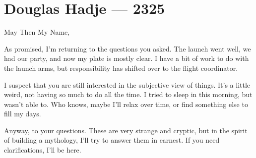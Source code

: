 \hypertarget{douglas-hadje-2325}{%
\chapter{Douglas Hadje — 2325}\label{douglas-hadje-2325}}

May Then My Name,

As promised, I'm returning to the questions you asked. The launch went well, we had our party, and now my plate is mostly clear. I have a bit of work to do with the launch arms, but responsibility has shifted over to the flight coordinator.

I suspect that you are still interested in the subjective view of things. It's a little weird, not having so much to do all the time. I tried to sleep in this morning, but wasn't able to. Who knows, maybe I'll relax over time, or find something else to fill my days.

Anyway, to your questions. These are very strange and cryptic, but in the spirit of building a mythology, I'll try to answer them in earnest. If you need clarifications, I'll be here.

